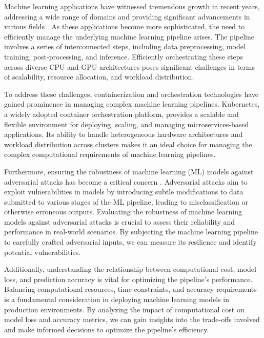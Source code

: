 \documentclass[conference]{IEEEtran}
\begin{document}
Machine learning applications have witnessed tremendous growth in recent years, addressing a wide range of domains and providing significant advancements in various fields \cite{li_general_2016, croce_reliable_2020, athalye_obfuscated_2018}. As these applications become more sophisticated, the need to efficiently manage the underlying machine learning pipeline arises. The pipeline involves a series of interconnected steps, including data preprocessing, model training, post-processing, and inference. Efficiently orchestrating these steps across diverse CPU and GPU architectures poses significant challenges in terms of scalability, resource allocation, and workload distribution.

To address these challenges, containerization and orchestration technologies have gained prominence in managing complex machine learning pipelines. Kubernetes, a widely adopted container orchestration platform, provides a scalable and flexible environment for deploying, scaling, and managing microservices-based applications. Its ability to handle heterogeneous hardware architectures and workload distribution across clusters makes it an ideal choice for managing the complex computational requirements of machine learning pipelines.

Furthermore, ensuring the robustness of machine learning (ML) models against adversarial attacks has become a critical concern \cite{adversarialpatch, carlini_towards_2017, croce_reliable_2020, hopskipjump, chakraborty2018adversarial, art2018}. Adversarial attacks aim to exploit vulnerabilities in models by introducing subtle modifications to data submitted to various stages of the ML pipeline, leading to misclassification or otherwise erroneous outputs. Evaluating the robustness of machine learning models against adversarial attacks is crucial to assess their reliability and performance in real-world scenarios. By subjecting the machine learning pipeline to carefully crafted adversarial inputs, we can measure its resilience and identify potential vulnerabilities.

Additionally, understanding the relationship between computational cost, model loss, and prediction accuracy is vital for optimizing the pipeline's performance. Balancing computational resources, time constraints, and accuracy requirements is a fundamental consideration in deploying machine learning models in production environments. By analyzing the impact of computational cost on model loss and accuracy metrics, we can gain insights into the trade-offs involved and make informed decisions to optimize the pipeline's efficiency.
\end{document}
